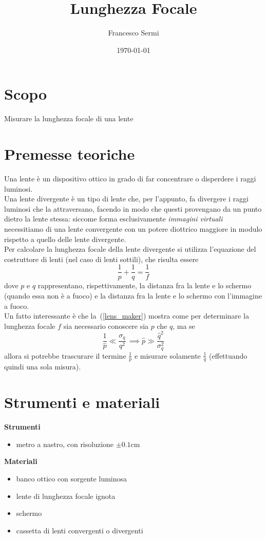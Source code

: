 \documentclass{article}
\title{Lunghezza Focale}
\author{Francesco Sermi}
\date{\today}
\begin{document}
	\maketitle
	\section{Scopo}
	Misurare la lunghezza focale di una lente
	\section{Premesse teoriche}
	Una lente è un dispositivo ottico in grado di far concentrare o disperdere i raggi luminosi. \\
	\noindent Una lente divergente è un tipo di lente che, per l'appunto, fa divergere i raggi luminosi che la attraversano, facendo in modo che questi provengano da un punto dietro la lente stessa: siccome forma esclusivamente \emph{immagini virtuali} necessitiamo di una lente convergente con un potere diottrico maggiore in modulo rispetto a quello delle lente divergente. \\
	Per calcolare la lunghezza focale della lente divergente si utilizza l'equazione del costruttore di lenti (nel caso di lenti sottili), che risulta essere
	\begin{equation}
		\frac{1}{p} + \frac{1}{q} = \frac{1}{f}
		\label{lens_maker}	
	\end{equation}
	dove $p$ e $q$ rappresentano, rispettivamente, la distanza fra la lente e lo schermo (quando essa non è a fuoco) e la distanza fra la lente e lo schermo con l'immagine a fuoco. \\
	Un fatto interessante è che la~(\ref{lens_maker}) mostra come per determinare la lunghezza focale $f$ sia necessario conoscere sia $p$ che $q$, ma se
	\begin{equation}
		\frac{1}{\hat{p}} \ll \frac{\sigma_q}{q^2} \, \implies \hat{p} \gg \frac{\hat{q}^2}{\sigma_q^2}
	\end{equation}
	allora si potrebbe trascurare il termine $\frac{1}{p}$ e misurare solamente $\frac{1}{q}$ (effettuando quindi una sola misura).
	\section{Strumenti e materiali}
	\textbf{Strumenti}	
	\begin{itemize}
		\item metro a nastro, con risoluzione $\pm 0.1 \si{\centi\meter}$
	\end{itemize}
	\textbf{Materiali}
	\begin{itemize}
		\item banco ottico con sorgente luminosa
		\item lente di lunghezza focale ignota
		\item schermo
		\item cassetta di lenti convergenti o divergenti
	\end{itemize}
\end{document}
